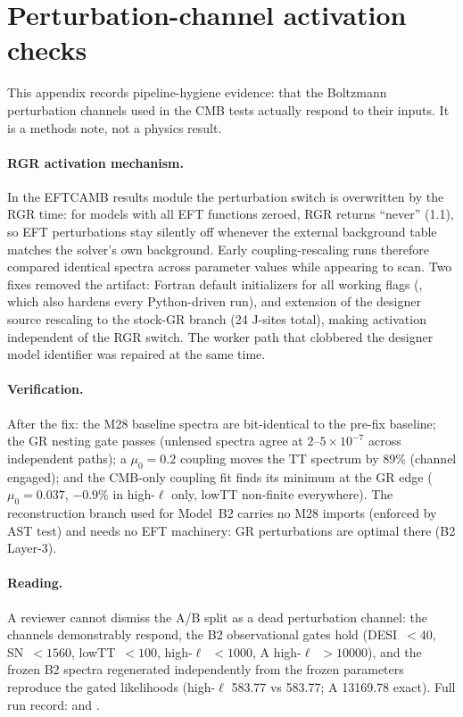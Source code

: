 \section{Perturbation-channel activation checks}
\label{app:activation}

This appendix records pipeline-hygiene evidence: that the Boltzmann
perturbation channels used in the CMB tests actually respond to their
inputs. It is a methods note, not a physics result.

\paragraph{RGR activation mechanism.} In the EFTCAMB results module the
perturbation switch is overwritten by the RGR time: for models with all
EFT functions zeroed, RGR returns ``never'' (1.1), so EFT perturbations
stay silently off whenever the external background table matches the
solver's own background. Early coupling-rescaling runs therefore
compared identical spectra across parameter values while appearing to
scan. Two fixes removed the artifact: Fortran default initializers for
all working flags (,
which also hardens every Python-driven run), and extension of the
designer source rescaling to the stock-GR branch (24 J-sites total),
making activation independent of the RGR switch. The worker path that
clobbered the designer model identifier was repaired at the same time.

\paragraph{Verification.} After the fix: the M28 baseline spectra are
bit-identical to the pre-fix baseline; the GR nesting gate passes
(unlensed spectra agree at $2$--$5\times10^{-7}$ across independent
paths); a $\mu_0=0.2$ coupling moves the TT spectrum by 89\% (channel
engaged); and the CMB-only coupling fit finds its minimum at the GR
edge ($\mu_0=0.037$, $-0.9\%$ in high-$\ell$ only, lowTT non-finite
everywhere). The reconstruction branch used for Model~B2 carries no M28
imports (enforced by AST test) and needs no EFT machinery: GR
perturbations are optimal there (B2 Layer-3).

\paragraph{Reading.} A reviewer cannot dismiss the A/B split as a dead
perturbation channel: the channels demonstrably respond, the B2
observational gates hold (DESI~$<40$, SN~$<1560$, lowTT~$<100$,
high-$\ell$~$<1000$, A high-$\ell$~$>10000$), and the frozen B2 spectra
regenerated independently from the frozen parameters reproduce the
gated likelihoods (high-$\ell$ 583.77 vs 583.77; A 13169.78 exact).
Full run record:  and
.

